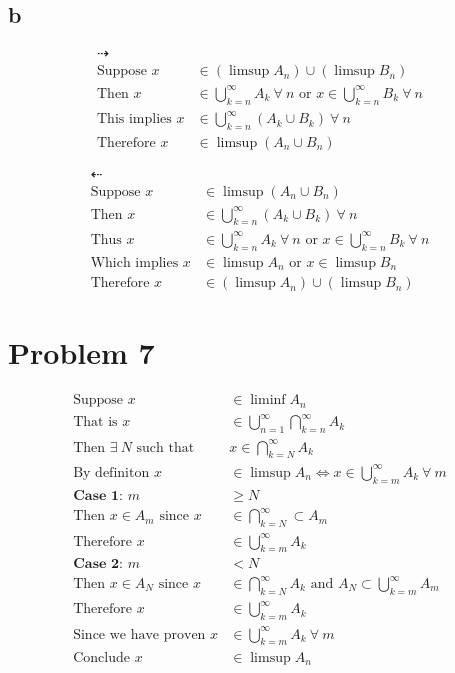 \documentclass{article}
\begin{document}
\begin{flushleft}
\subsection*{b}
\begin{align*}
\dashrightarrow\\
\text{Suppose } x &\in (\limsup A_n) \cup (\limsup B_n)\\
\text{Then } x &\in \bigcup \limits_{k=n}^{\infty} A_k \ \forall \ n \text{ or }
x \in \bigcup \limits_{k=n}^{\infty} B_k \ \forall \ n\\
\text{This implies } x &\in \bigcup \limits_{k=n}^{\infty} (A_k \cup B_k) \ \forall \ n\\
\text{Therefore } x &\in \limsup (A_n \cup B_n)
\end{align*}

\begin{align*}
\dashleftarrow\\
\text{Suppose } x &\in \limsup (A_n \cup  B_n)\\
\text{Then } x &\in \bigcup \limits_{k=n}^{\infty} (A_k \cup B_k) \ \forall \ n\\
\text{Thus } x &\in  \bigcup \limits_{k=n}^{\infty} A_k \ \forall \ n \text{ or } x \in  \bigcup \limits_{k=n}^{\infty} B_k \ \forall \ n\\
\text{Which implies } x &\in \limsup A_n \text{ or } x\in \limsup B_n\\
\text{Therefore }  x &\in (\limsup A_n) \cup (\limsup B_n)
\end{align*}

\section*{Problem 7}
\begin{align*}
\text{Suppose } x&\in \liminf A_n\\
\text{That is } x&\in \bigcup \limits_{n=1}^{\infty} \bigcap \limits_{k=n}^{\infty} A_k\\
\text{Then } \exists \ N \text{ such that } &x\in \bigcap \limits_{k=N}^{\infty} A_k\\
\text{By definiton } x &\in \limsup A_n \iff x\in \bigcup \limits_{k=m}^{\infty} A_k \ \forall \ m \\
\textbf{Case 1: } m&\geq N\\
\text{Then } x\in A_m \text{ since } x& \in \bigcap \limits_{k=N}^{\infty} \subset A_m\\
\text{Therefore } x&\in \bigcup \limits_{k=m}^{\infty} A_k\\
\textbf{Case 2: } m&<N\\
\text{Then } x\in A_N \text{ since } x& \in \bigcap \limits_{k=N}^{\infty} A_k
\text{ and } A_N \subset \bigcup \limits_{k=m}^{\infty} A_m\\
\text{Therefore } x&\in \bigcup \limits_{k=m}^{\infty} A_k\\
\text{Since we have proven } x&\in \bigcup \limits_{k=m}^{\infty} A_k \ \forall \ m\\
\text{Conclude } x &\in \limsup A_n 
\end{align*}
\end{flushleft}
\end{document}
